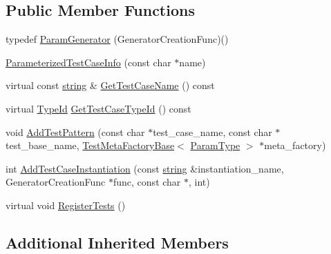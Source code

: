 \subsection*{Public Member Functions}
\begin{DoxyCompactItemize}
\item 
typedef \hyperlink{classtesting_1_1internal_1_1_parameterized_test_case_info_a2f6a423f7ae8c7ac24b468538693aa26}{Param\-Generator} (Generator\-Creation\-Func)()
\item 
\hyperlink{classtesting_1_1internal_1_1_parameterized_test_case_info_a0a03ac9620ed8f0266f74ff774de9b71}{Parameterized\-Test\-Case\-Info} (const char $\ast$name)
\item 
virtual const \hyperlink{namespacetesting_1_1internal_a5ca8a348395a6145775c1a2334e21889}{string} \& \hyperlink{classtesting_1_1internal_1_1_parameterized_test_case_info_a6bb64ce694fcfaa9f95ba613552bcf80}{Get\-Test\-Case\-Name} () const 
\item 
virtual \hyperlink{namespacetesting_1_1internal_a38c435cbab5f8b784e2e7f3356cab242}{Type\-Id} \hyperlink{classtesting_1_1internal_1_1_parameterized_test_case_info_a059b58d138d6e4c9bfaa020b1e5d9be2}{Get\-Test\-Case\-Type\-Id} () const 
\item 
void \hyperlink{classtesting_1_1internal_1_1_parameterized_test_case_info_a3e557c888ec5e23b138c2ff254db15e5}{Add\-Test\-Pattern} (const char $\ast$test\-\_\-case\-\_\-name, const char $\ast$test\-\_\-base\-\_\-name, \hyperlink{classtesting_1_1internal_1_1_test_meta_factory_base}{Test\-Meta\-Factory\-Base}$<$ \hyperlink{classtesting_1_1internal_1_1_parameterized_test_case_info_a643a87e178bf92a4246ce21054e44b96}{Param\-Type} $>$ $\ast$meta\-\_\-factory)
\item 
int \hyperlink{classtesting_1_1internal_1_1_parameterized_test_case_info_afa906b3f9fbc494ba13cf491abbc81fa}{Add\-Test\-Case\-Instantiation} (const \hyperlink{namespacetesting_1_1internal_a5ca8a348395a6145775c1a2334e21889}{string} \&instantiation\-\_\-name, Generator\-Creation\-Func $\ast$func, const char $\ast$, int)
\item 
virtual void \hyperlink{classtesting_1_1internal_1_1_parameterized_test_case_info_a7e118820b3074ce70c0440e2e49a50a1}{Register\-Tests} ()
\end{DoxyCompactItemize}
\subsection*{Additional Inherited Members}


